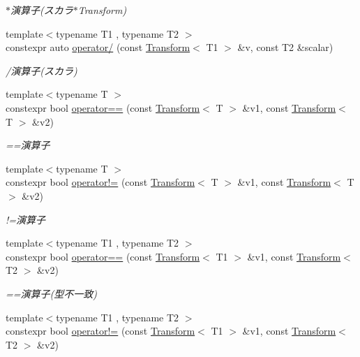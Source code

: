 \begin{DoxyCompactItemize}
\begin{DoxyCompactList}\small\item\em $\ast$演算子(スカラ$\ast$\+Transform) \end{DoxyCompactList}\item 
{\footnotesize template$<$typename T1 , typename T2 $>$ }\\constexpr auto \mbox{\hyperlink{namespacesaki_a1a09a61ecb48d44bcb9dc201ab30216b}{operator/}} (const \mbox{\hyperlink{classsaki_1_1_transform}{Transform}}$<$ T1 $>$ \&v, const T2 \&scalar)
\begin{DoxyCompactList}\small\item\em /演算子(スカラ) \end{DoxyCompactList}\item 
{\footnotesize template$<$typename T $>$ }\\constexpr bool \mbox{\hyperlink{namespacesaki_a547efe3eda4f6c4f41c5bda2676a8c0a}{operator==}} (const \mbox{\hyperlink{classsaki_1_1_transform}{Transform}}$<$ T $>$ \&v1, const \mbox{\hyperlink{classsaki_1_1_transform}{Transform}}$<$ T $>$ \&v2)
\begin{DoxyCompactList}\small\item\em ==演算子 \end{DoxyCompactList}\item 
{\footnotesize template$<$typename T $>$ }\\constexpr bool \mbox{\hyperlink{namespacesaki_a0133284e616db2357d94a6cf561e7f60}{operator!=}} (const \mbox{\hyperlink{classsaki_1_1_transform}{Transform}}$<$ T $>$ \&v1, const \mbox{\hyperlink{classsaki_1_1_transform}{Transform}}$<$ T $>$ \&v2)
\begin{DoxyCompactList}\small\item\em !=演算子 \end{DoxyCompactList}\item 
{\footnotesize template$<$typename T1 , typename T2 $>$ }\\constexpr bool \mbox{\hyperlink{namespacesaki_a55c0ab8cb5196de1f32bf7bbe49591f0}{operator==}} (const \mbox{\hyperlink{classsaki_1_1_transform}{Transform}}$<$ T1 $>$ \&v1, const \mbox{\hyperlink{classsaki_1_1_transform}{Transform}}$<$ T2 $>$ \&v2)
\begin{DoxyCompactList}\small\item\em ==演算子(型不一致) \end{DoxyCompactList}\item 
{\footnotesize template$<$typename T1 , typename T2 $>$ }\\constexpr bool \mbox{\hyperlink{namespacesaki_a3853c55574719f3a97496132fdcfbd94}{operator!=}} (const \mbox{\hyperlink{classsaki_1_1_transform}{Transform}}$<$ T1 $>$ \&v1, const \mbox{\hyperlink{classsaki_1_1_transform}{Transform}}$<$ T2 $>$ \&v2)

\end{DoxyCompactItemize}

